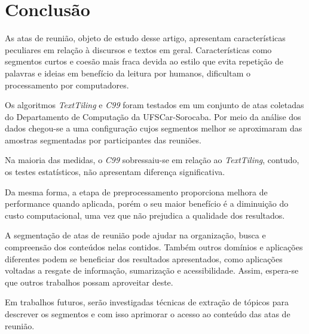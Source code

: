 \section{Conclusão}
	\label{sec:conclusao}

As atas de reunião, objeto de estudo desse artigo, apresentam características peculiares em relação à discursos e textos em geral. Características como segmentos curtos e coesão mais fraca devida ao estilo que evita repetição de palavras e ideias em benefício da leitura por humanos, dificultam o processamento por computadores.



Os algoritmos \textit{TextTiling} e \textit{C99} foram testados em um conjunto de atas coletadas do Departamento de Computação da UFSCar-Sorocaba. Por meio da análise dos dados chegou-se a uma configuração cujos segmentos melhor se aproximaram das amostras segmentadas por participantes das reuniões. 


Na maioria das medidas, o \textit{C99} sobressaiu-se em relação ao \textit{TextTiling}, contudo, os testes estatísticos, não apresentam diferença significativa. 



Da mesma forma, a etapa de preprocessamento proporciona melhora de performance quando aplicada, porém o seu maior benefício é a diminuição do custo computacional, uma vez que não prejudica a qualidade dos resultados.



A segmentação de atas de reunião pode ajudar na organização, busca e compreensão dos conteúdos nelas contidos. Também outros domínios e aplicações diferentes podem se beneficiar dos resultados apresentados, como aplicações voltadas a resgate de informação, sumarização e acessibilidade. Assim, espera-se que outros trabalhos possam aproveitar deste.
	
	
Em trabalhos futuros, serão investigadas técnicas de extração de tópicos para descrever os segmentos e com isso aprimorar o acesso ao conteúdo das atas de reunião.




